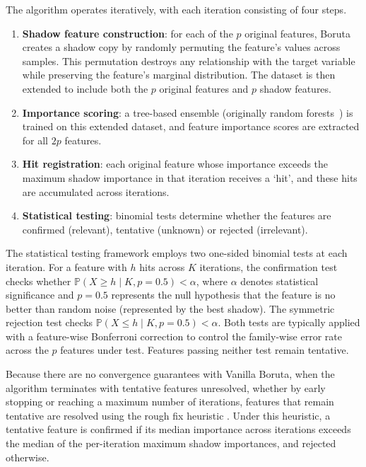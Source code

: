 \documentclass[runningheads]{llncs}
\begin{document}
The algorithm operates iteratively, with each iteration consisting of four steps.
\begin{enumerate}
    \item \textbf{Shadow feature construction}: for each of the $p$ original features, Boruta creates a shadow copy by randomly permuting the feature's values across samples. This permutation destroys any relationship with the target variable while preserving the feature's marginal distribution. The dataset is then extended to include both the $p$ original features and $p$ shadow features. 
    \item \textbf{Importance scoring}: a tree-based ensemble (originally random forests~\cite{breiman2001random}) is trained on this extended dataset, and feature importance scores are extracted for all $2p$ features. 
    \item \textbf{Hit registration}: each original feature whose importance exceeds the maximum shadow importance in that iteration receives a `hit', and these hits are accumulated across iterations. 
    \item \textbf{Statistical testing}: binomial tests determine whether the features are confirmed (relevant), tentative (unknown) or rejected (irrelevant).
\end{enumerate}

The statistical testing framework employs two one-sided binomial tests at each iteration. For a feature with $h$ hits across $K$ iterations, the confirmation test checks whether $\mathbb{P}(X \geq h \mid K, p=0.5) < \alpha$, where $\alpha$ denotes statistical significance and $p = 0.5$ represents the null hypothesis that the feature is no better than random noise (represented by the best shadow). The symmetric rejection test checks $\mathbb{P}(X \leq h \mid K, p=0.5) < \alpha$. Both tests are typically applied with a feature-wise Bonferroni correction to control the family-wise error rate across the $p$ features under test. Features passing neither test remain tentative.

Because there are no convergence guarantees with Vanilla Boruta, when the algorithm terminates with tentative features unresolved, whether by early stopping or reaching a maximum number of iterations, features that remain tentative are resolved using the rough fix heuristic \cite{kursa2010feature}. Under this heuristic, a tentative feature is confirmed if its median importance across iterations exceeds the median of the per-iteration maximum shadow importances, and rejected otherwise. 
\end{document}
